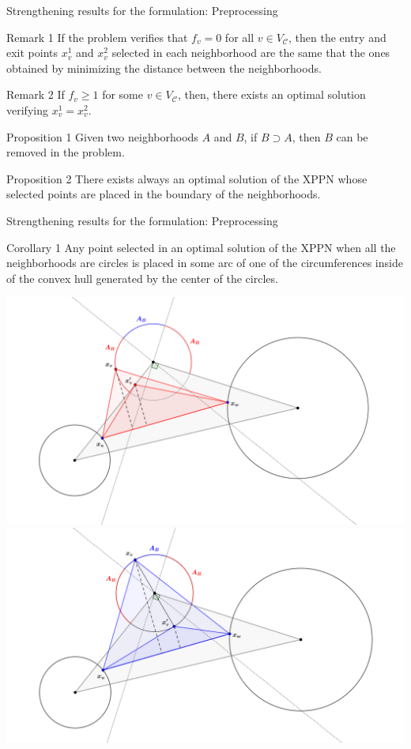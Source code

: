 \documentclass[slidestop,usepdftitle=false,10pt]{beamer}
\begin{document}
	\begin{frame}{Strengthening results for the formulation: Preprocessing}
	\begin{small}
	\begin{block}{Remark 1}
		If the problem verifies that $f _v= 0$ for all $v\in V _{\mathcal C}$, then the entry and exit points $x_v^1$ and $x_v^2$ selected in each neighborhood are the same that the ones obtained by minimizing the distance between the neighborhoods.
	\end{block}
	
	    \begin{block}{Remark 2}
	        If $f_v\geq 1$ for some $v\in V_{\mathcal C}$, then, there exists an optimal solution verifying $x_v^1=x_v^2$.
	    \end{block}
	    
       	\begin{block}{Proposition 1}
            Given two neighborhoods $A$ and $B$, if $B\supset A$, then $B$ can be removed in the 						problem.
        \end{block}
	    \begin{block}{Proposition 2}
	        There exists always an optimal solution of the XPPN whose selected points are placed in the boundary of the neighborhoods.
	    \end{block}
	 \end{small}
	    
	 \end{frame}
	 
	 \begin{frame}{Strengthening results for the formulation: Preprocessing}
	    \begin{block}{Corollary 1}
	        Any point selected in an optimal solution of the XPPN when all the neighborhoods are circles is placed in some arc of one of the circumferences inside of the convex hull generated by the center of the circles.
	    \end{block}
	    
	    \begin{center}
         \includegraphics[width=0.45\linewidth]{XPPN-Corollary21a.png} \label{fig:corolario1}
         \includegraphics[width=0.45\linewidth]{XPPN-Corollary21b.png} \label{fig:corolario2}
        \end{center}
        
        


	\end{frame}
\end{document}
